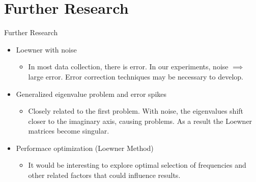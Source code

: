 \section{Further Research}

\begin{frame}{Further Research}
\begin{itemize}
    \item Loewner with noise
    \begin{itemize}
        \item In most data collection, there is error. In our experiments, noise \(\implies\) large error. Error correction techniques may be necessary to develop.
    \end{itemize}
    \bigskip
    \item Generalized eigenvalue problem and error spikes
    \begin{itemize}
        \item Closely related to the first problem. With noise, the eigenvalues shift closer to the imaginary axis, causing problems. As a result the Loewner matrices become singular.
    \end{itemize}
    \bigskip
    \item Performace optimization (Loewner Method)
    \begin{itemize}
        \item It would be interesting to explore optimal selection of frequencies and other related factors that could influence results.
    \end{itemize}
\end{itemize}





\end{frame}
